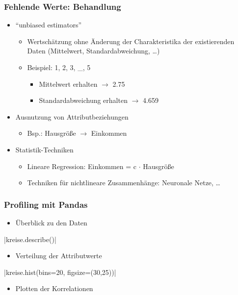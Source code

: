     
    \begin{frame}
    \frametitle{Fehlende Werte: Behandlung}
    
    \begin{itemize}
    \item "`unbiased estimators"'
    \begin{itemize}
    \item Wertschätzung ohne Änderung der Charakteristika der
      existierenden Daten (Mittelwert, Standardabweichung, \dots) 
    \item Beispiel: 1, 2, 3, \_, 5
    \begin{itemize}
    \item Mittelwert erhalten $\rightarrow$ 2.75
    \item Standardabweichung erhalten $\rightarrow$ 4.659
    \end{itemize}
    \end{itemize}
    \item Ausnutzung von Attributbeziehungen
    \begin{itemize}
    \item Bsp.: Hausgröße $\rightarrow$ Einkommen
    \end{itemize}
    \item Statistik-Techniken
    \begin{itemize}
    \item Lineare Regression: Einkommen = c $\cdot$ Hausgröße
    \item Techniken für nichtlineare Zusammenhänge: Neuronale Netze, \dots
    \end{itemize}
    \end{itemize}
    
    \end{frame}
    
    
    \begin{frame}
    \frametitle{Profiling mit Pandas}
    
    \begin{itemize}
    \item Überblick zu den Daten
    \end{itemize}
    
    |kreise.describe()|
    
    \begin{itemize}
    \item Verteilung der Attributwerte
    \end{itemize}
    
    |kreise.hist(bins=20, figsize=(30,25))|
    
    \begin{itemize}
    \item Plotten der Korrelationen
    \end{itemize}
    
    \end{frame}
    

